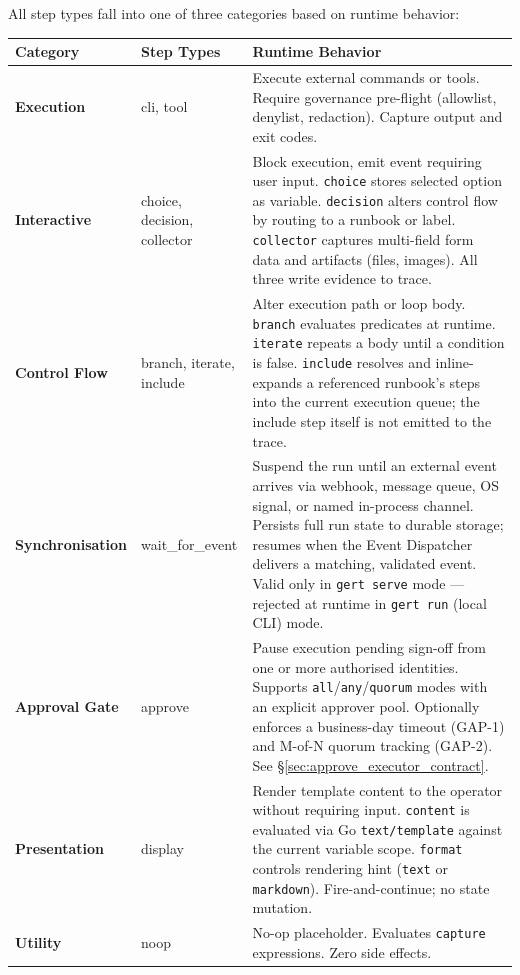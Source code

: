 All step types fall into one of three categories based on runtime behavior:

\begin{center}
\begin{tabular}{|l|l|p{7cm}|}
\hline
\textbf{Category} & \textbf{Step Types} & \textbf{Runtime Behavior} \\
\hline
\textbf{Execution} & cli, tool & Execute external commands or tools. Require governance
pre-flight (allowlist, denylist, redaction). Capture output and exit codes. \\
\hline
\textbf{Interactive} & choice, decision, collector & Block execution, emit event requiring
user input. \texttt{choice} stores selected option as variable. \texttt{decision} alters
control flow by routing to a runbook or label. \texttt{collector} captures multi-field
form data and artifacts (files, images). All three write evidence to trace. \\
\hline
\textbf{Control Flow} & branch, iterate, include & Alter execution path or loop body. \texttt{branch}
evaluates predicates at runtime. \texttt{iterate} repeats a body until a condition is false.
\texttt{include} resolves and inline-expands a referenced runbook's steps into the current
execution queue; the include step itself is not emitted to the trace. \\
\hline
\textbf{Synchronisation} & wait\_for\_event & Suspend the run until an external event arrives via
webhook, message queue, OS signal, or named in-process channel. Persists full run state to durable
storage; resumes when the Event Dispatcher delivers a matching, validated event. Valid only in
\texttt{gert serve} mode — rejected at runtime in \texttt{gert run} (local CLI) mode. \\
\hline
\textbf{Approval Gate} & approve & Pause execution pending sign-off from one or more authorised
identities. Supports \texttt{all}/\texttt{any}/\texttt{quorum} modes with an explicit approver
pool. Optionally enforces a business-day timeout (GAP-1) and M-of-N quorum tracking (GAP-2). See
§\ref{sec:approve_executor_contract}. \\
\hline
\textbf{Presentation} & display & Render template content to the operator without requiring input.
\texttt{content} is evaluated via Go \texttt{text/template} against the current variable scope.
\texttt{format} controls rendering hint (\texttt{text} or \texttt{markdown}). Fire-and-continue;
no state mutation. \\
\hline
\textbf{Utility} & noop & No-op placeholder. Evaluates \texttt{capture} expressions. Zero side effects. \\
\hline
\end{tabular}
\end{center}


